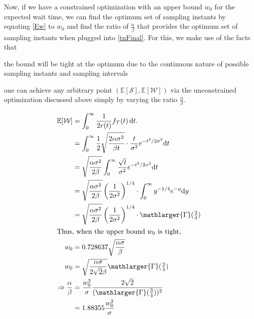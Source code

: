 Now, if we have a constrained optimization with an upper bound $w_0$ for the expected wait time, we can find the optimum set of sampling instants by equating \cref{Ew} to $w_0$ and find the ratio of $\frac{\alpha}{\beta}$ that provides the optimum set of sampling instants when plugged into \cref{tnFinal}.
For this, we make use of the facts that
\begin{inlineenum}
    \item the bound will be tight at the optimum due to the continuous nature of possible sampling instants and sampling intervals
    \item one can achieve any arbitrary point $(\mathbb{E}[\mathcal{S}],\mathbb{E}[\mathcal{W}])$ via the unconstrained optimization discussed above simply by varying the ratio $\frac{\alpha}{\beta}$.
\end{inlineenum}
\begin{alignat*}{1}
\mathbb{E}[\mathcal{W}]&=\int_{0}^{\infty}\dfrac{1}{2r(t)}f_\mathcal{T}(t)\,\mathrm{d}t.\nonumber\\
&=\int_{0}^{\infty}\frac{1}{2}\sqrt{\frac{2\alpha\sigma^2}{\beta t}}\cdot \frac{t}{\sigma^2}e^{-{t^2}/{2\sigma^2}}\mathrm{d}t\\
&=\sqrt{\frac{\alpha\sigma^2}{2\beta}}\int_{0}^{\infty}\frac{\sqrt{t}}{\sigma^2}e^{-{t^2}/{2\sigma^2}}\mathrm{d}t\\
&=\sqrt{\frac{\alpha\sigma^2}{2\beta}}\left({\frac{1}{{2}\sigma^2}}\right)^{1/4}\cdot\int_{0}^{\infty}y^{-1/4}e^{-y}\mathrm{d}y\\
&=\sqrt{\frac{\alpha\sigma^2}{2\beta}}\left({\frac{1}{{2}\sigma^2}}\right)^{1/4}\cdot\mathlarger{\Gamma}(\tfrac{3}{4})\\
\intertext{Thus, when the upper bound $w_0$ is tight,}
w_0&=0.728637\sqrt{\frac{\alpha\sigma}{\beta}}\\
w_0&=\sqrt{\frac{\alpha\sigma}{2\sqrt{2}\beta}}\mathlarger{\Gamma}(\tfrac{3}{4})\\
\Rightarrow\frac{\alpha}{\beta}&=\frac{w_0^2}{\sigma}\frac{2\sqrt{2}}{(\mathlarger{\Gamma}(\tfrac{3}{4}))^2}\\&=1.88355\frac{w_0^2}{\sigma}
\end{alignat*}

